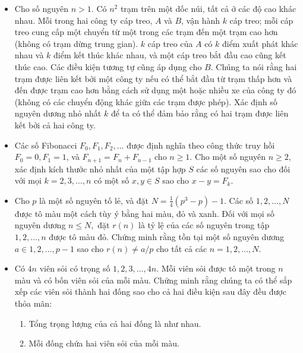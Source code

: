 \documentclass[11pt]{scrartcl}
\begin{document}
\begin{itemize}[label=, leftmargin=0em, itemsep=-0em]
    \item \begin{btvn}
        Cho số nguyên $n > 1$. Có $n^2$ trạm trên một dốc núi, tất cả ở các độ cao khác nhau. Mỗi trong hai công ty cáp treo, $A$ và $B$, vận hành $k$ cáp treo; mỗi cáp treo cung cấp một chuyển từ một trong các trạm đến một trạm cao hơn (không có trạm dừng trung gian). $k$ cáp treo của $A$ có $k$ điểm xuất phát khác nhau và $k$ điểm kết thúc khác nhau, và một cáp treo bắt đầu cao cũng kết thúc cao. Các điều kiện tương tự cũng áp dụng cho $B$. Chúng ta nói rằng hai trạm được liên kết bởi một công ty nếu có thể bắt đầu từ trạm thấp hơn và đến được trạm cao hơn bằng cách sử dụng một hoặc nhiều xe của công ty đó (không có các chuyển động khác giữa các trạm được phép). Xác định số nguyên dương nhỏ nhất $k$ để ta có thể đảm bảo rằng có hai trạm được liên kết bởi cả hai công ty.
    \end{btvn}

    \item \begin{btvn}
        Các số Fibonacci $F_0, F_1, F_2, . . .$ được định nghĩa theo công thức truy hồi $F_0=0, F_1=1$, và $F_{n+1}=F_n+F_{n-1}$ cho $n \ge 1$. Cho một số nguyên $n \ge 2$, xác định kích thước nhỏ nhất của một tập hợp $S$ các số nguyên sao cho đối với mọi $k=2, 3, . . . , n$ có một số $x, y \in S$ sao cho $x-y=F_k$.
    \end{btvn}

    \item \begin{btvn}
        Cho $p$ là một số nguyên tố lẻ, và đặt $N=\frac{1}{4} (p^3 -p) -1.$ Các số $1,2, \dots, N$ được tô màu một cách tùy ý bằng hai màu, đỏ và xanh. Đối với mọi số nguyên dương $n \leqslant N,$ đặt $r(n)$ là tỷ lệ của các số nguyên trong tập ${ 1,2, \dots, n }$ được tô màu đỏ.
        Chứng minh rằng tồn tại một số nguyên dương $a \in { 1,2, \dots, p-1}$ sao cho $r(n) \neq a/p$ cho tất cả các $n = 1,2, \dots , N.$
    \end{btvn}

    \item \begin{btvn}
        Có $4n$ viên sỏi có trọng số $1, 2, 3, \dots, 4n.$ Mỗi viên sỏi được tô một trong $n$ màu và có bốn viên sỏi của mỗi màu. Chứng minh rằng chúng ta có thể sắp xếp các viên sỏi thành hai đống sao cho cả hai điều kiện sau đây đều được thỏa mãn:
        \begin{enumerate}[label=(\alph*)]
            \item Tổng trọng lượng của cả hai đống là như nhau.
            \item Mỗi đống chứa hai viên sỏi của mỗi màu.
        \end{enumerate}
    \end{btvn}


\end{itemize}
\end{document}
